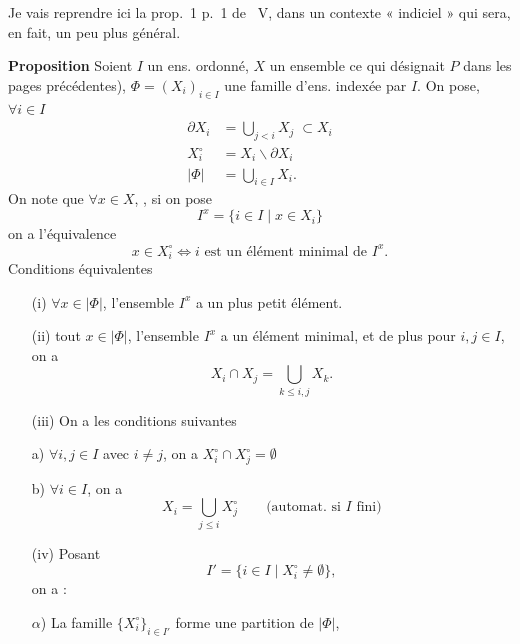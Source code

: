 \documentclass[11pt,a4paper]{article}
\begin{document}
Je vais reprendre ici la prop.~1 p.~1 de ~V, dans un contexte
« indiciel » qui sera, en fait, un peu plus général.

\textbf{Proposition} Soient $I$ un ens. ordonné, \struck{\ill{}} $X$ un
ensemble  \ill{} ce qui désignait $P$ dans
les pages précédentes), $\Phi = (X_i)_{i \in I}$ une famille d'ens. indexée
par $I$. On pose, $\forall i \in I$
\marginal{On suppose $i \leq j \Rightarrow X_i \subset X_j$ [je ne suppose \ill{} \ill{}, mais \ill{} pour définir $X_i^\circ = X_i \smallsetminus \partial X_i$ \ill{} \ill{} $\partial X_i \subset X_i$)}
\begin{align*}
\partial X_i &= \bigcup_{j<i} X_j \;\subset X_i \\
X_i^\circ &= X_i \smallsetminus \partial X_i \\
|\Phi| &= \bigcup_{i \in I} X_i .
\end{align*}
On note que $\forall x \in X$, , si on pose
\[
I^x = \{ i \in I \mid x \in X_i \}
\]
on a l'équivalence
\[
x \in X_i^\circ \Longleftrightarrow i \text{ est un élément minimal de } I^x .
\]
Conditions équivalentes
\begin{itemize}
  \item[(i)] $\forall x \in |\Phi|$, l'ensemble $I^x$ a un plus petit élément.
  \item[(ii)]  tout $x \in |\Phi|$, l'ensemble $I^x$ a un élément
  minimal,  et de plus pour $i, j \in I$, on a
  \[
  X_i \cap X_j = \bigcup_{k \leq i, j} X_k .
  \]
  \item[(iii)] On a les conditions suivantes
\end{itemize}
\begin{itemize}
  \item[a)] $\forall i, j \in I$ avec $i \neq j$, on a $X_i^\circ \cap X_j^\circ = \emptyset$
  \item[b)] \struck{\ill{}} $\forall i \in I$, on a
  \[
  X_i = \bigcup_{j \leq i} X_j^\circ \qquad \text{(automat. si $I$ fini)}
  \]
\end{itemize}
\begin{itemize}
  \item[(iv)] Posant 
  \[
  I' = \{ i \in I \mid X_i^\circ \neq \emptyset \} ,
  \]
  on a : 
\end{itemize}
\begin{itemize}
  \item[$\alpha$)] La famille $\{X_i^\circ\}_{i \in I'}$ forme une
  partition de $|\Phi|$, \struck{\ill{}}
\end{itemize}
\end{document}
